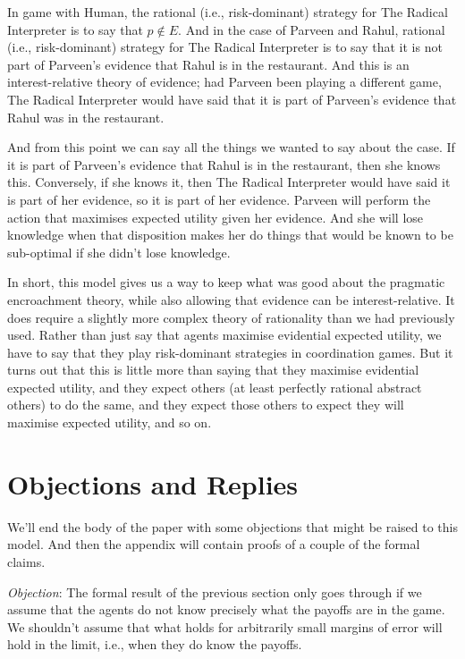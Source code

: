In game with Human, the rational (i.e., risk-dominant) strategy for The Radical Interpreter is to say that $p \notin E$. And in the case of Parveen and Rahul, rational (i.e., risk-dominant) strategy for The Radical Interpreter is to say that it is not part of Parveen's evidence that Rahul is in the restaurant. And this is an interest-relative theory of evidence; had Parveen been playing a different game, The Radical Interpreter would have said that it is part of Parveen's evidence that Rahul was in the restaurant. 

And from this point we can say all the things we wanted to say about the case. If it is part of Parveen's evidence that Rahul is in the restaurant, then she knows this. Conversely, if she knows it, then The Radical Interpreter would have said it is part of her evidence, so it is part of her evidence. Parveen will perform the action that maximises expected utility given her evidence. And she will lose knowledge when that disposition makes her do things that would be known to be sub-optimal if she didn't lose knowledge.

In short, this model gives us a way to keep what was good about the pragmatic encroachment theory, while also allowing that evidence can be interest-relative. It does require a slightly more complex theory of rationality than we had previously used. Rather than just say that agents maximise evidential expected utility, we have to say that they play risk-dominant strategies in coordination games. But it turns out that this is little more than saying that they maximise evidential expected utility, and they expect others (at least perfectly rational abstract others) to do the same, and they expect those others to expect they will maximise expected utility, and so on.

\section{Objections and Replies}
\label{objectionsandreplies}

We'll end the body of the paper with some objections that might be raised to this model. And then the appendix will contain proofs of a couple of the formal claims.

\emph{Objection}: The formal result of the previous section only goes through if we assume that the agents do not know precisely what the payoffs are in the game. We shouldn't assume that what holds for arbitrarily small margins of error will hold in the limit, i.e., when they do know the payoffs.

